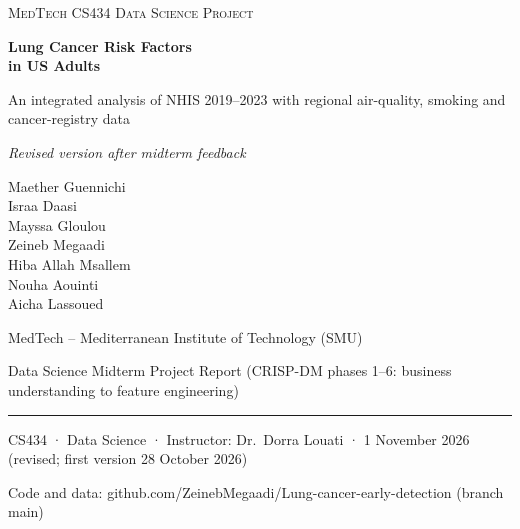 \begin{titlepage}
\thispagestyle{empty}
\centering
{\small\scshape MedTech \textbar{} CS434 Data Science Project\par}
\vspace*{3cm}
{\Huge\bfseries Lung Cancer Risk Factors\\ in US Adults\par}
\vspace{0.8em}
{\large An integrated analysis of NHIS 2019--2023 with regional air-quality, smoking and cancer-registry data\par}
\vspace{0.6em}
{\normalsize\itshape Revised version after midterm feedback\par}
\vspace{2.5cm}
{\large
Maether Guennichi\\[0.3em]
Israa Daasi\\[0.3em]
Mayssa Gloulou\\[0.3em]
Zeineb Megaadi\\[0.3em]
Hiba Allah Msallem\\[0.3em]
Nouha Aouinti\\[0.3em]
Aicha Lassoued\par}
\vfill
{\large MedTech -- Mediterranean Institute of Technology (SMU)\par}
\vspace{0.4em}
{Data Science Midterm Project Report (CRISP-DM phases 1--6: business understanding to feature engineering)\par}
\vspace{1em}
\rule{0.8\textwidth}{0.4pt}\par
\vspace{0.6em}
{CS434 · Data Science · Instructor: Dr.\ Dorra Louati · 1 November 2026 (revised; first version 28 October 2026)\par}
\vspace{0.3em}
{\small Code and data: github.com/ZeinebMegaadi/Lung-cancer-early-detection (branch main)\par}
\end{titlepage}
